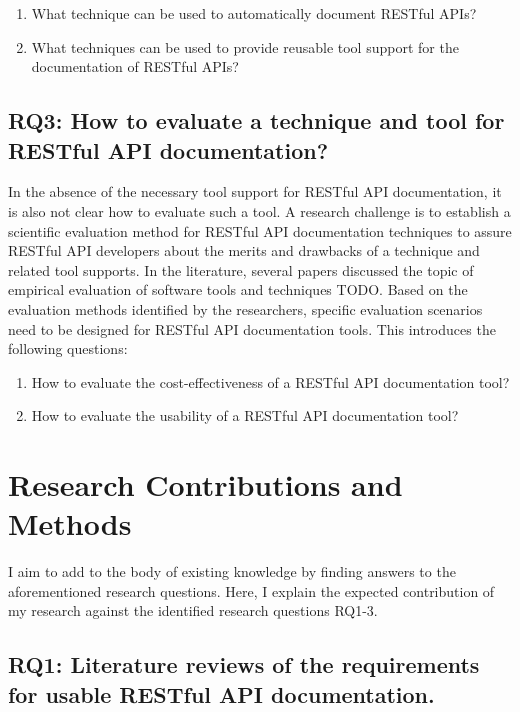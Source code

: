\documentclass[11pt,oneside]{book}
\begin{document}
\begin{enumerate}
  \item What technique can be used to automatically document RESTful APIs?
  \item What techniques can be used to provide reusable tool support for the documentation of RESTful APIs?
\end{enumerate}

\section{RQ3: How to evaluate a technique and tool for RESTful API documentation?}

In the absence of the necessary tool support for RESTful API documentation, it is also not clear how to evaluate such a tool. A research challenge is to establish a scientific evaluation method for RESTful API documentation techniques to assure RESTful API developers about the merits and drawbacks of a technique and related tool supports. In the literature, several papers discussed the topic of empirical evaluation of software tools and techniques TODO. Based on the evaluation methods identified by the researchers, specific evaluation scenarios need to be designed for RESTful API documentation tools. This introduces the following questions:

\begin{enumerate}
\item How to evaluate the cost-effectiveness of a RESTful API documentation tool?
\item How to evaluate the usability of a RESTful API documentation tool?
\end{enumerate}


\chapter{Research Contributions and Methods}

I aim to add to the body of existing knowledge by finding answers to the aforementioned research questions. Here, I explain the expected contribution of my research against the identified research questions RQ1-3.

\section{RQ1: Literature reviews of the requirements for usable RESTful API documentation.}
\end{document}
